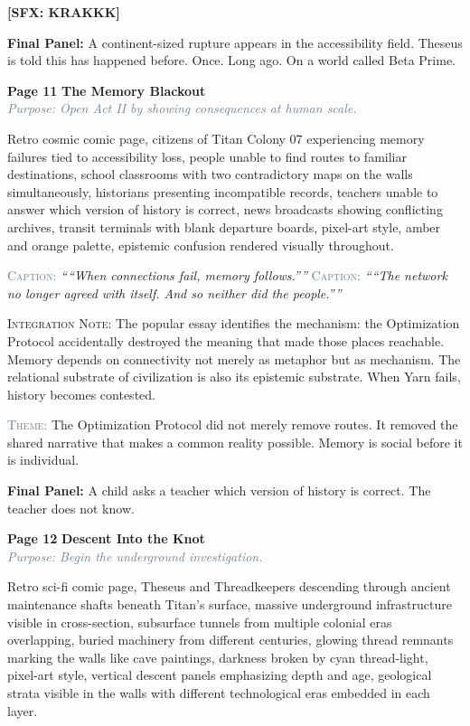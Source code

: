 \documentclass[11pt]{article}
\newcommand{\pagecaption}[1]{\medskip\noindent\textcolor{slateGray}{\textsc{Caption:}} \textit{``#1''}\medskip}
\newcommand{\sfx}[1]{\medskip\noindent\textcolor{warnRed}{\textbf{[SFX: #1]}}\medskip}
\newcommand{\cliffhanger}[1]{\medskip\noindent\textcolor{cyanThread}{\textbf{Final Panel:}} #1\medskip}
\newcommand{\prompt}[1]{\begin{terminal}{\small #1}\end{terminal}}
\newcommand{\theme}[1]{\medskip\noindent\textcolor{slateGray}{\textsc{Theme:}} #1\medskip}
\newcommand{\integration}[1]{\medskip\noindent\textcolor{archiveGold}{\textsc{Integration Note:}} #1\medskip}
\newcommand{\pageheading}[3]{%
  \begin{pagebox}
    \noindent\textbf{\textcolor{titanOrange}{Page #1}} \hfill \textbf{\textcolor{cyanThread}{#2}}\\[2pt]
    \noindent\textcolor{slateGray}{\textit{Purpose: #3}}
  \end{pagebox}
  \medskip
}
\begin{document}
\sfx{KRAKKK}

\cliffhanger{A continent-sized rupture appears in the accessibility field. Theseus is told this has happened before. Once. Long ago. On a world called Beta Prime.}

\vspace{0.5em}

\pageheading{11}{The Memory Blackout}{Open Act II by showing consequences at human scale.}

\prompt{Retro cosmic comic page, citizens of Titan Colony 07 experiencing memory failures tied to accessibility loss, people unable to find routes to familiar destinations, school classrooms with two contradictory maps on the walls simultaneously, historians presenting incompatible records, teachers unable to answer which version of history is correct, news broadcasts showing conflicting archives, transit terminals with blank departure boards, pixel-art style, amber and orange palette, epistemic confusion rendered visually throughout.}

\pagecaption{``When connections fail, memory follows.''}
\pagecaption{``The network no longer agreed with itself. And so neither did the people.''}

\integration{The popular essay identifies the mechanism: the Optimization Protocol accidentally destroyed the meaning that made those places reachable. Memory depends on connectivity not merely as metaphor but as mechanism. The relational substrate of civilization is also its epistemic substrate. When Yarn fails, history becomes contested.}

\theme{The Optimization Protocol did not merely remove routes. It removed the shared narrative that makes a common reality possible. Memory is social before it is individual.}

\cliffhanger{A child asks a teacher which version of history is correct. The teacher does not know.}

\vspace{0.5em}

\pageheading{12}{Descent Into the Knot}{Begin the underground investigation.}

\prompt{Retro sci-fi comic page, Theseus and Threadkeepers descending through ancient maintenance shafts beneath Titan's surface, massive underground infrastructure visible in cross-section, subsurface tunnels from multiple colonial eras overlapping, buried machinery from different centuries, glowing thread remnants marking the walls like cave paintings, darkness broken by cyan thread-light, pixel-art style, vertical descent panels emphasizing depth and age, geological strata visible in the walls with different technological eras embedded in each layer.}
\end{document}
